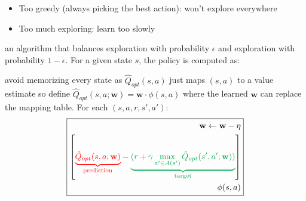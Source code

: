 \begin{itemize}
    \item Too greedy (always picking the best action): won't explore everywhere
    \item Too much exploring: learn too slowly
\end{itemize}

 an algorithm that balances exploration with
probability $\epsilon$ and exploration with probability $1-\epsilon$. For a
given state $s$, the policy is computed as:

 avoid memorizing every state as
$\hat{Q}_{opt}(s,a)$ just maps $(s,a)$ to a value estimate so define
$\hat{Q}_{opt}(s,a; \mathbf{w}) = \mathbf{w} \cdot \phi(s,a)$ where the learned
$\mathbf{w}$ can replace the mapping table.
For each $(s,a,r,s',a')$:
\begin{displaymath}
\boxed{
\begin{aligned}
    \mathbf{w} \leftarrow \mathbf{w} - \eta \\
    \left[
        \textcolor{red}{\underbrace{\hat{Q}_{opt}(s,a; \mathbf{w})}_{\text{prediction}}}
        - \textcolor{Green}{\underbrace{(r + \gamma \max_{a' \in A(s')}\hat{Q}_{opt}(s',a'; \mathbf{w}))}_{\text{target}}}
    \right] \\
    \phi(s,a)
\end{aligned}
}
\end{displaymath}